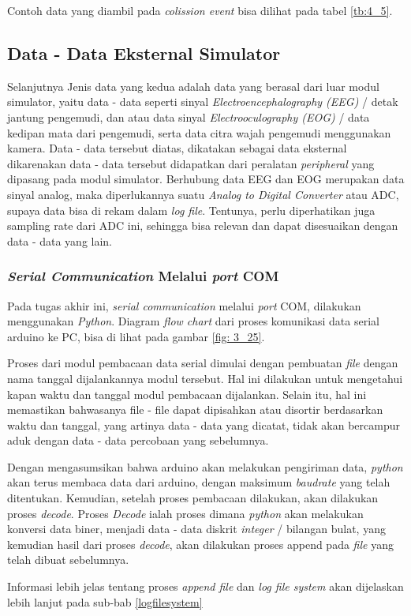          \par Contoh data yang diambil pada \textit{colission event} bisa dilihat pada tabel \ref{tb:4_5}.
        
    
    \subsection{Data - Data Eksternal Simulator}
    \vspace{1ex}
    
     Selanjutnya Jenis data yang kedua adalah data yang berasal dari luar modul simulator, yaitu data - data seperti sinyal \textit{Electroencephalography (EEG)} / detak jantung pengemudi, dan atau data sinyal \textit{Electrooculography (EOG)} / data kedipan mata dari pengemudi, serta data citra wajah pengemudi menggunakan kamera. Data - data tersebut diatas, dikatakan sebagai data eksternal dikarenakan data - data tersebut didapatkan dari peralatan \textit{peripheral} yang dipasang pada modul simulator. Berhubung data EEG dan EOG merupakan data sinyal analog, maka diperlukannya suatu \textit{Analog to Digital Converter} atau ADC, supaya data bisa di rekam dalam \textit{log file}.
     Tentunya, perlu diperhatikan juga sampling rate dari ADC ini, sehingga bisa relevan dan dapat disesuaikan dengan data - data yang lain.
     
        \subsubsection{\textit{Serial Communication} Melalui \textit{port} COM}
        Pada tugas akhir ini, \textit{serial communication} melalui \textit{port} COM, dilakukan menggunakan \textit{Python}. Diagram \textit{flow chart} dari proses komunikasi data serial arduino ke PC, bisa di lihat pada gambar \ref{fig: 3_25}.
        \par Proses dari modul pembacaan data serial dimulai dengan pembuatan \textit{file} dengan nama tanggal dijalankannya modul tersebut. Hal ini dilakukan untuk mengetahui kapan waktu dan tanggal modul pembacaan dijalankan. Selain itu, hal ini memastikan bahwasanya file - file dapat dipisahkan atau disortir berdasarkan waktu dan tanggal, yang artinya data - data yang dicatat, tidak akan bercampur aduk dengan data - data percobaan yang sebelumnya.
        \par Dengan mengasumsikan bahwa arduino akan melakukan pengiriman data, \textit{python} akan terus membaca data dari arduino, dengan maksimum \textit{baudrate} yang telah ditentukan. Kemudian, setelah proses pembacaan dilakukan, akan dilakukan proses \textit{decode}. Proses \textit{Decode} ialah proses dimana \textit{python} akan melakukan konversi data biner, menjadi data - data diskrit \textit{integer} / bilangan bulat, yang kemudian hasil dari proses \textit{decode}, akan dilakukan proses append pada \textit{file} yang telah dibuat sebelumnya. 
        \par Informasi lebih jelas tentang proses \textit{append file} dan \textit{log file system} akan dijelaskan lebih lanjut pada sub-bab \ref{logfilesystem}
        
